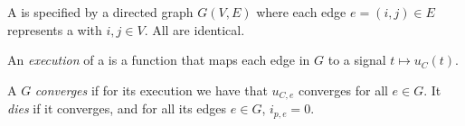 \documentclass[	hyperref={pdfpagelabels=false}, xcolor=dvipsnames,
		11pt]{beamer}
\begin{document}
\begin{frame}
		\begin{figure}[h]
		     \begin{center}
		     \end{center}
		\end{figure}
\end{frame}

\begin{frame}
    \frametitle{\Pns}

    A \Pn is specified by a directed graph $G(V,E)$ where each edge $e = (i, j) \in E$ represents a \Pe with $i, j \in V$. All \Pes are identical.

    An \emph{execution} of a \Pn is a function that maps each edge in $G$ to a signal $t \mapsto u_C(t)$.

    A \Pn $G$ \emph{converges} if for its execution we have that $u_{C,e}$ converges for all $e \in G$. It \emph{dies} if it converges, and for all its edges $e \in G$, $i_{p,e} = 0$.
\end{frame}
\end{document}
